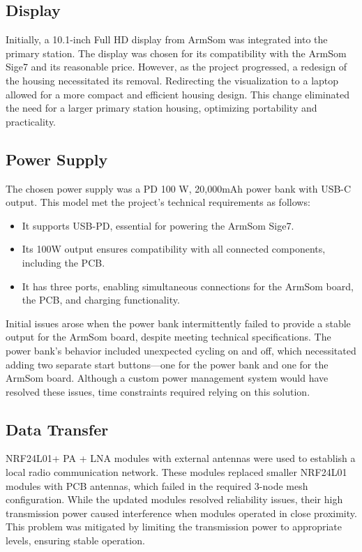 \subsection{Display}
Initially, a 10.1-inch Full HD display from ArmSom was integrated into the primary station. The display was chosen for its compatibility with the ArmSom Sige7 and its reasonable price. However, as the project progressed, a redesign of the housing necessitated its removal. Redirecting the visualization to a laptop allowed for a more compact and efficient housing design. This change eliminated the need for a larger primary station housing, optimizing portability and practicality.

\subsection{Power Supply}
The chosen power supply was a PD 100 W, 20,000mAh power bank with USB-C output. This model met the project's technical requirements as follows:
\begin{itemize}
	\item It supports USB-PD, essential for powering the ArmSom Sige7.
	\item Its 100W output ensures compatibility with all connected components, including the PCB.
	\item It has three ports, enabling simultaneous connections for the ArmSom board, the PCB, and charging functionality.
\end{itemize}
Initial issues arose when the power bank intermittently failed to provide a stable output for the ArmSom board, despite meeting technical specifications. The power bank's behavior included unexpected cycling on and off, which necessitated adding two separate start buttons—one for the power bank and one for the ArmSom board. Although a custom power management system would have resolved these issues, time constraints required relying on this solution.

\subsection{Data Transfer}
NRF24L01+ PA + LNA modules with external antennas were used to establish a local radio communication network. These modules replaced smaller NRF24L01 modules with PCB antennas, which failed in the required 3-node mesh configuration. While the updated modules resolved reliability issues, their high transmission power caused interference when modules operated in close proximity. This problem was mitigated by limiting the transmission power to appropriate levels, ensuring stable operation.

